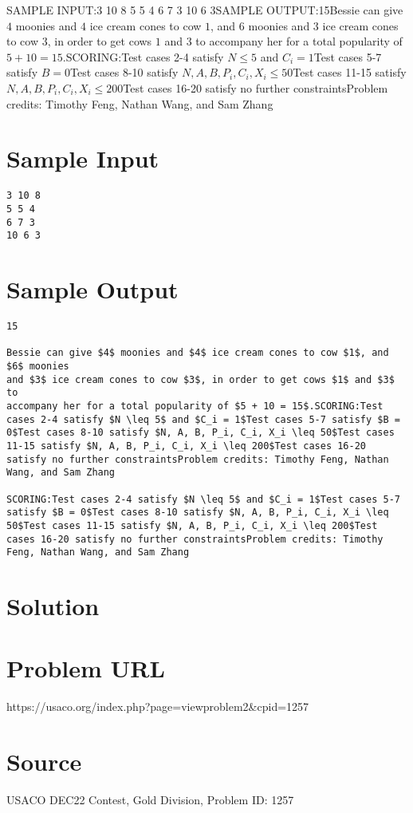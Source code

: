 \documentclass[12pt]{article}
\begin{document}
SAMPLE INPUT:3 10 8
5 5 4
6 7 3
10 6 3SAMPLE OUTPUT:15Bessie can give $4$ moonies and $4$ ice cream cones to cow $1$, and $6$ moonies
and $3$ ice cream cones to cow $3$, in order to get cows $1$ and $3$ to
accompany her for a total popularity of $5 + 10 = 15$.SCORING:Test cases 2-4 satisfy $N \leq 5$ and $C_i = 1$Test cases 5-7 satisfy $B = 0$Test cases 8-10 satisfy $N, A, B, P_i, C_i, X_i \leq 50$Test cases 11-15 satisfy $N, A, B, P_i, C_i, X_i \leq 200$Test cases 16-20 satisfy no further constraintsProblem credits: Timothy Feng, Nathan Wang, and Sam Zhang

\section*{Sample Input}
\begin{verbatim}
3 10 8
5 5 4
6 7 3
10 6 3
\end{verbatim}

\section*{Sample Output}
\begin{verbatim}
15

Bessie can give $4$ moonies and $4$ ice cream cones to cow $1$, and $6$ moonies
and $3$ ice cream cones to cow $3$, in order to get cows $1$ and $3$ to
accompany her for a total popularity of $5 + 10 = 15$.SCORING:Test cases 2-4 satisfy $N \leq 5$ and $C_i = 1$Test cases 5-7 satisfy $B = 0$Test cases 8-10 satisfy $N, A, B, P_i, C_i, X_i \leq 50$Test cases 11-15 satisfy $N, A, B, P_i, C_i, X_i \leq 200$Test cases 16-20 satisfy no further constraintsProblem credits: Timothy Feng, Nathan Wang, and Sam Zhang

SCORING:Test cases 2-4 satisfy $N \leq 5$ and $C_i = 1$Test cases 5-7 satisfy $B = 0$Test cases 8-10 satisfy $N, A, B, P_i, C_i, X_i \leq 50$Test cases 11-15 satisfy $N, A, B, P_i, C_i, X_i \leq 200$Test cases 16-20 satisfy no further constraintsProblem credits: Timothy Feng, Nathan Wang, and Sam Zhang
\end{verbatim}

\section*{Solution}


\section*{Problem URL}
https://usaco.org/index.php?page=viewproblem2&cpid=1257

\section*{Source}
USACO DEC22 Contest, Gold Division, Problem ID: 1257
\end{document}
